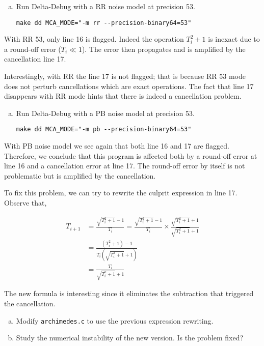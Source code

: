 \begin{question}
  \begin{enumerate}[(a)]
    \item Run Delta-Debug with a RR noise model at precision 53.
      \begin{verbatim}
make dd MCA_MODE="-m rr --precision-binary64=53"
      \end{verbatim}
  \end{enumerate}
\end{question}

With RR 53, only line 16 is flagged. Indeed the operation $T_i^2+1$ is inexact
due to a round-off error ($T_i \ll 1$). The error then propagates and is amplified
by the cancellation line 17.

Interestingly, with RR the line 17 is not flagged; that is because RR 53 mode
does not perturb cancellations which are exact operations. The fact that line
17 disappears with RR mode hints that there is indeed a cancellation problem.

\begin{question}
  \begin{enumerate}[(a)]
    \item Run Delta-Debug with a PB noise model at precision 53.
      \begin{verbatim}
make dd MCA_MODE="-m pb --precision-binary64=53"
      \end{verbatim}
  \end{enumerate}
\end{question}

With PB noise model we see again that both line 16 and 17 are flagged.
Therefore, we conclude that this program is affected both by a round-off error
at line 16 and a cancellation error at line 17. The round-off error by itself
is not problematic but is amplified by the cancellation.

To fix this problem, we can try to rewrite the culprit expression in line 17.
Observe that,

\begin{align*}
  T_{i+1} &= \frac{\sqrt{T_i^2+1} - 1}{T_i} = \frac{\sqrt{T_i^2+1} - 1}{T_i} \times \frac{\sqrt{T_i^2+1} + 1}{\sqrt{T_i^2+1} + 1} \\
          &= \frac{(T_i^2 + 1) - 1}{T_i(\sqrt{T_i^2+1} + 1)} \\
          &= \frac{T_i}{\sqrt{T_i^2+1} + 1}
\end{align*}

The new formula is interesting since it eliminates the subtraction that triggered the cancellation.

\begin{question}
  \begin{enumerate}[(a)]
    \item Modify \texttt{archimedes.c} to use the previous expression rewriting.
    \item Study the numerical instability of the new version. Is the problem fixed?
  \end{enumerate}
\end{question}
